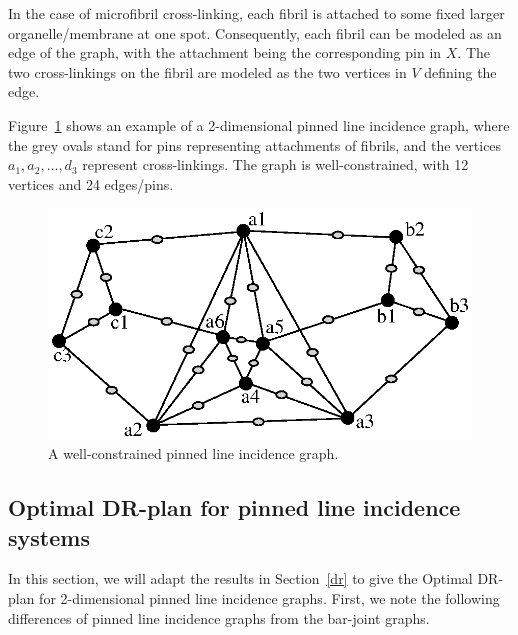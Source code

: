 In the case of microfibril cross-linking, each fibril is 
attached to some fixed larger organelle/membrane at one spot.
Consequently, each fibril can be modeled as an edge of the graph, 
with the attachment being the corresponding pin in $X$. 
The two cross-linkings on the fibril are modeled as the two vertices in $V$ defining the edge. 


Figure~\ref{fig:pinned_line} shows an example of a 2-dimensional pinned line incidence graph, 
where the grey ovals stand for pins representing attachments of fibrils, 
and the vertices $a_1,a_2,\ldots, d_3$ represent cross-linkings.
The graph is well-constrained, with 12 vertices and 24 edges/pins.

\begin{figure}
  \centering
  \includegraphics[width=.9\linewidth]{img/pinned}
\caption{ A well-constrained pinned line incidence graph.}
\label{fig:pinned_line}
\end{figure}


\subsection{Optimal DR-plan for pinned line incidence systems}


In this section, we will adapt the results in Section~\ref{dr}
to give the Optimal DR-plan for 2-dimensional pinned line incidence graphs.
First, we note the following differences of pinned line incidence graphs from the bar-joint graphs.

